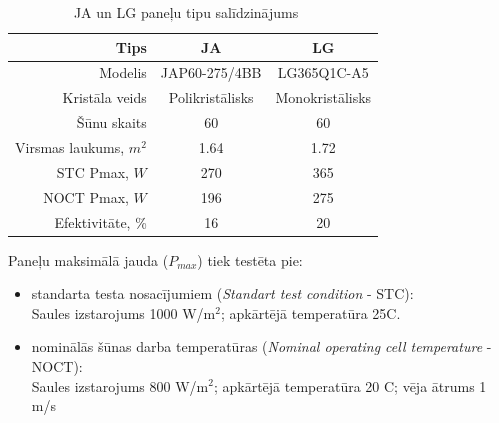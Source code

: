 \begin{table}[h]
    \caption{JA un LG paneļu tipu salīdzinājums~\cite{JAtips}~\cite{LGtips}} %
    \begin{center}
    \begin{tabular}{| r | c | c |}
    \hline
    Tips & JA & LG \\ \hline
    Modelis &  JAP60-275/4BB & LG365Q1C-A5\\ \hline
	Kristāla veids & Polikristālisks & Monokristālisks \\ \hline
	Šūnu skaits  &60  &60 \\ \hline
	Virsmas laukums, $m^2$ &1.64  &1.72 \\ \hline
	STC Pmax, $W$ 	&270 &365\\ \hline
	NOCT Pmax, $W$  &196 &275\\ \hline
	Efektivitāte, \% &16 & 20\\ \hline
    \end{tabular}
    \end{center}
    \label{tab:ja_lg_tipi}
\end{table}

Paneļu maksimālā jauda ($P_{max}$) tiek testēta pie:
\begin{itemize}
\item standarta testa nosacījumiem (\textit{Standart test condition} - STC):\\
Saules izstarojums 1000 W/m$^2$; apkārtējā temperatūra 25\textdegree C.
\item nominālās šūnas darba temperatūras (\textit{Nominal operating cell temperature} - NOCT):\\
Saules izstarojums 800 W/m$^2$; apkārtējā temperatūra 20 \textdegree C; vēja ātrums 1 m/s
\end{itemize}



